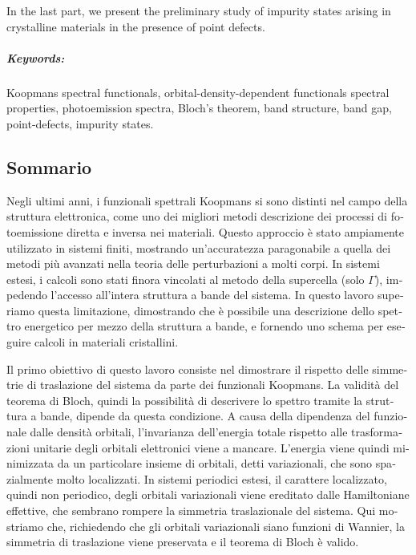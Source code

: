 In the last part, we present the preliminary study of impurity states arising in crystalline materials in the presence of point defects.

%
\paragraph{Keywords:}
Koopmans spectral functionals,
orbital-density-dependent functionals
spectral properties,
photoemission spectra,
Bloch's theorem,
band structure,
band gap,
point-defects,
impurity states.
%

\begin{otherlanguage}{italian}
\cleardoublepage
\chapter*{Sommario}
\vspace{2cm}
%

Negli ultimi anni, i funzionali spettrali Koopmans si sono distinti nel campo della struttura elettronica, come uno dei migliori metodi descrizione dei processi di fotoemissione diretta e inversa nei materiali. Questo approccio \`{e} stato ampiamente utilizzato in sistemi finiti, mostrando un'accuratezza paragonabile a quella dei metodi più avanzati nella teoria delle perturbazioni a molti corpi. In sistemi estesi, i calcoli sono stati finora vincolati al metodo della supercella (solo $\Gamma$), impedendo l'accesso all'intera struttura a bande del sistema. In questo lavoro superiamo questa limitazione, dimostrando che \`{e} possibile una descrizione dello spettro energetico  per mezzo della struttura a bande, e fornendo uno schema per eseguire calcoli in materiali cristallini.

Il primo obiettivo di questo lavoro consiste nel dimostrare il rispetto delle simmetrie di traslazione del sistema da parte dei funzionali Koopmans. La validit\`{a} del teorema di Bloch, quindi la possibilit\`{a} di descrivere lo spettro tramite la struttura a bande, dipende da questa condizione. A causa della dipendenza del funzionale dalle densit\`{a} orbitali, l'invarianza dell'energia totale rispetto alle trasformazioni unitarie degli orbitali elettronici viene a mancare. L'energia viene quindi minimizzata da un particolare insieme di orbitali, detti variazionali, che sono spazialmente molto localizzati. In sistemi periodici estesi, il carattere localizzato, quindi non periodico, degli orbitali variazionali viene ereditato dalle Hamiltoniane effettive, che sembrano rompere la simmetria traslazionale del sistema. Qui mostriamo che, richiedendo che gli orbitali variazionali siano funzioni di Wannier, la simmetria di traslazione viene preservata e il teorema di Bloch \`{e} valido.


\end{otherlanguage}
